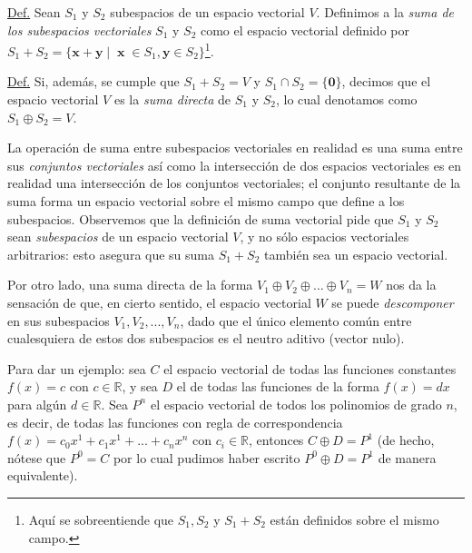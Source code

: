\documentclass[12pt,dvipsnames]{article}
\begin{document}
\begin{tcolorbox}
\underline{Def.} Sean $S_1$ y $S_2$ subespacios de un espacio vectorial $V$. Definimos a la \emph{suma de los subespacios vectoriales} $S_1$ y $S_2$ como el espacio vectorial definido por $S_1+S_2=\{\mathbf{x}+\mathbf{y}\mathop|\mathop \mathbf{x}\in S_1, \mathbf{y}\in S_2\}$\footnote{Aquí se sobreentiende que $S_1, S_2$ y $S_1+S_2$ están definidos sobre el mismo campo.}.

\vspace{3mm}

\underline{Def.} Si, además, se cumple que $S_1+S_2=V$ y $S_1 \cap S_2 = \{\mathbf{0}\}$, decimos que el espacio vectorial $V$ es la \emph{suma directa} de $S_1$ y $S_2$, lo cual denotamos como $S_1\oplus S_2=V$.
\end{tcolorbox}

La operación de suma entre subespacios vectoriales en realidad es una suma entre sus \emph{conjuntos vectoriales} \textemdash así como la intersección de dos espacios vectoriales es en realidad una intersección de los conjuntos vectoriales\textemdash; el conjunto resultante de la suma forma un espacio vectorial sobre el mismo campo que define a los subespacios. Observemos que la definición de suma vectorial pide que $S_1$ y $S_2$ sean \emph{subespacios} de un espacio vectorial $V$, y no sólo espacios vectoriales arbitrarios: esto asegura que su suma $S_1+S_2$ también sea un espacio vectorial.

Por otro lado, una suma directa de la forma $V_1\oplus V_2\oplus...\oplus V_n=W$ nos da la sensación de que, en cierto sentido, el espacio vectorial $W$ se puede \emph{descomponer} en sus subespacios $V_1, V_2,...,V_n$, dado que el único elemento común entre cualesquiera de estos dos subespacios es el neutro aditivo (vector nulo).

\vspace{3mm}

Para dar un ejemplo: sea $C$ el espacio vectorial de todas las funciones constantes $f(x) = c$ con $c\in\mathbb{R}$, y sea $D$ el de todas las funciones de la forma $f(x) = d x$ para algún $d\in\mathbb{R}$. Sea $P^n$ el espacio vectorial de todos los polinomios de grado $n$, es decir, de todas las funciones con regla de correspondencia $f(x) = c_0 x^1 + c_1 x^1 + ... + c_n x^n$ con $c_i\in\mathbb{R}$, entonces $C\oplus D = P^1$ (de hecho, nótese que $P^0=C$ por lo cual pudimos haber escrito $P^0\oplus D=P^1$ de manera equivalente).

\vspace{3mm}
\end{document}

